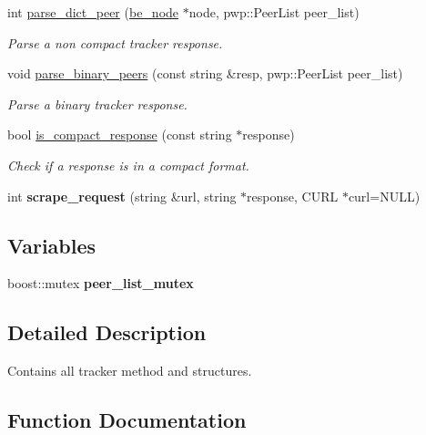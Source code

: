 \begin{DoxyCompactItemize}
int \hyperlink{namespacetracker_a38d52cf6dd86f2a26a719e285097c805}{parse\+\_\+dict\+\_\+peer} (\hyperlink{structbe__node}{be\+\_\+node} $\ast$node, pwp\+::\+Peer\+List peer\+\_\+list)
\begin{DoxyCompactList}\small\item\em Parse a non compact tracker response. \end{DoxyCompactList}\item 
void \hyperlink{namespacetracker_a237de4c8b0282af2d59cd5d0b7bfd1fd}{parse\+\_\+binary\+\_\+peers} (const string \&resp, pwp\+::\+Peer\+List peer\+\_\+list)
\begin{DoxyCompactList}\small\item\em Parse a binary tracker response. \end{DoxyCompactList}\item 
bool \hyperlink{namespacetracker_ae542bb4bf17f34b8cadc3a4ae2f5ced2}{is\+\_\+compact\+\_\+response} (const string $\ast$response)
\begin{DoxyCompactList}\small\item\em Check if a response is in a compact format. \end{DoxyCompactList}\item 
\mbox{\label{namespacetracker_a3426052cbc1ef8f22a629e4468cd70e6}} 
int {\bfseries scrape\+\_\+request} (string \&url, string $\ast$response, C\+U\+RL $\ast$curl=N\+U\+LL)
\end{DoxyCompactItemize}
\subsection*{Variables}
\begin{DoxyCompactItemize}
\item 
\mbox{\label{namespacetracker_a53fb7c4cde6ffdc06505609407c563ad}} 
boost\+::mutex {\bfseries peer\+\_\+list\+\_\+mutex}
\end{DoxyCompactItemize}


\subsection{Detailed Description}
Contains all tracker method and structures. 

\subsection{Function Documentation}
\mbox{\label{namespacetracker_a2ceea8b68053534e15cb3ac3fd1702fb}} 

